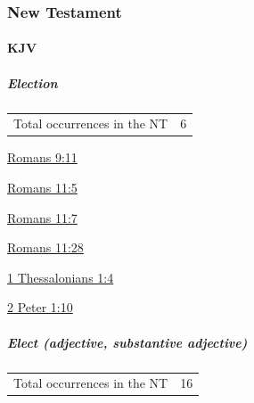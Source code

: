 			
		
		
	\subsubsection{New Testament} %
		\label{ELECTION-NT}
	
		\paragraph{KJV}
			\label{ELECTION-NT-KJV}
			
			\subparagraph{Election}
	
				\begin{tabular}{ll}
					Total occurrences in the NT & 6
				\end{tabular}
				
				\begin{compactdesc}
					\item[{\hyperref[ROMANS-9-11]{Romans 9:11}}]
					\item[{\hyperref[ROMANS-11-5]{Romans 11:5}}]
					\item[{\hyperref[ROMANS-11-7]{Romans 11:7}}]
					\item[{\hyperref[ROMANS-11-28]{Romans 11:28}}]
					\item[{\hyperref[1THESSALONIANS-1-4]{1 Thessalonians 1:4}}]
					\item[{\hyperref[2PETER-1-10]{2 Peter 1:10}}]
				\end{compactdesc}
				
			\subparagraph{Elect (adjective, substantive adjective)}
	
				\begin{tabular}{ll}
					Total occurrences in the NT & 16
				\end{tabular}
				
